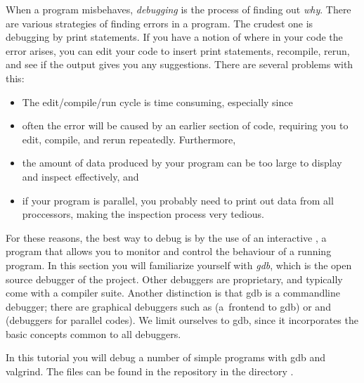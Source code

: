 

When a program misbehaves, \emph{debugging} is the process of finding
out \emph{why}.
There are various strategies of finding errors in a program.
The crudest one is debugging by print statements. If you have a
notion of where in your code the error arises, you can edit your code
to insert print statements, recompile, rerun, and see if the output
gives you any suggestions. There are several problems with this:
\begin{itemize}
\item The edit/compile/run cycle is time consuming, especially since
\item often the error will be caused by an earlier section of code,
  requiring you to edit, compile, and rerun repeatedly. Furthermore,
\item the amount of data produced by your program can be too large to
  display and inspect effectively, and
\item if your program is parallel, you probably need to print out data
  from all proccessors, making the inspection process very tedious.
\end{itemize}

For these reasons, the best way to debug is by the use of an
interactive , a program that allows you to monitor
and control the behaviour of a running program. In this section you
will familiarize yourself with
\emph{gdb}, which is the open source
debugger of the  project. Other debuggers are
proprietary, and typically come with a compiler suite. Another
distinction is that gdb is a commandline debugger; there are
graphical debuggers such as  (a~frontend to gdb) or
 and  (debuggers for parallel
codes). We limit ourselves to gdb, since it incorporates the basic
concepts common to all debuggers.

In this tutorial you will debug a number of simple programs with
gdb and valgrind. The files can be found in the repository
in the directory .

